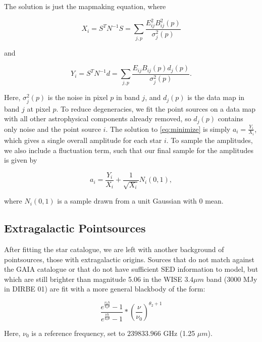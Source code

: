\documentclass{aa}
\begin{document}
The solution is just the mapmaking equation, where

\begin{equation}
X_i = S^T N^{-1} S = \sum_{j,p}\frac{E_{ij}^2 B^2_{ij}(p)}{\sigma_j^2(p)} 
\end{equation}

and

\begin{equation}
Y_i = S^TN^{-1}d = \sum_{j,p} \frac{E_{ij}B_{ij}(p) d_j(p)}{\sigma_j^2(p)}.
\end{equation}

Here, $\sigma_j^2(p)$ is the noise in pixel $p$ in band $j$, and $d_j(p)$ is the data map in band $j$ at pixel $p$. To reduce degeneracies, we fit the point sources on a data map with all other astrophysical components already removed, so $d_j(p)$ contains only noise and the point source $i$. The solution to \ref{eq:minimize} is simply $a_i = \frac{Y_i}{X_i}$, which gives a single overall amplitude for each star $i$. To sample the amplitudes, we also include a fluctuation term, such that our final sample for the amplitudes is given by

\begin{equation}
a_i = \frac{Y_i}{X_i} + \frac{1}{\sqrt{X_i}} N_i(0,1),
\end{equation}

where $N_i(0,1)$ is a sample drawn from a unit Gaussian with 0 mean.

\subsection{Extragalactic Pointsources}

\label{sec:extragalacticmodel}

After fitting the star catalogue, we are left with another background of pointsources, those with extragalactic origins. Sources that do not match against the GAIA catalogue or that do not have sufficient SED information to model, but which are still brighter than magnitude 5.06 in the WISE $3.4 \mu m$ band ($3000$ MJy in DIRBE 01) are fit with a more general blackbody of the form:

\begin{equation}
\frac{e^{\frac{\nu_0 h}{k_b \theta}} - 1}{e^{\frac{\nu h}{k_b \theta}} - 1} * (\frac{\nu}{\nu_0})^{\theta_2 + 1}
\end{equation}

Here, $\nu_0$ is a reference frequency, set to $239833.966$ GHz (1.25 $\mu m$). 
\end{document}
